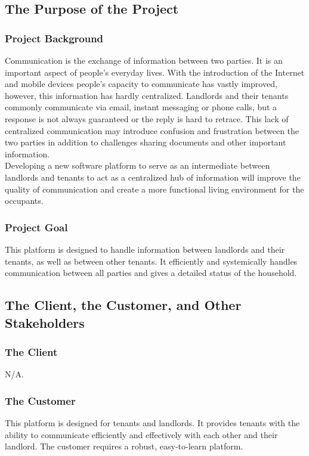 \documentclass[12pt]{article}
\begin{document}
\subsection{The Purpose of the Project}
\subsubsection{Project Background}
Communication is the exchange of information between two parties. It is an important aspect of people's everyday lives. With the introduction 
of the Internet and mobile devices people's capacity to communicate has vastly 
improved, however, this information has hardly centralized. Landlords and their 
tenants commonly communicate via email, instant messaging or phone calls, but a response is not always guaranteed or the reply is hard to retrace. This lack of centralized 
communication may introduce confusion and frustration between the two parties in addition to challenges sharing documents and other important information.\\

\noindent Developing a new software platform to serve as an intermediate between 
landlords and tenants to act as a centralized hub of information will improve 
the quality of communication and create a more functional living environment 
for the occupants.

\subsubsection{Project Goal}
This platform is designed to handle information between landlords and their 
tenants, as well as between other tenants. It efficiently and systemically 
handles communication between all parties and gives a detailed status of the household.

\subsection{The Client, the Customer, and Other Stakeholders}
\subsubsection {The Client}
  N/A.
\subsubsection {The Customer}
This platform is designed for tenants and landlords. It provides tenants with the ability to communicate efficiently and effectively with each other and their landlord. The customer requires a robust, easy-to-learn platform.
\end{document}
